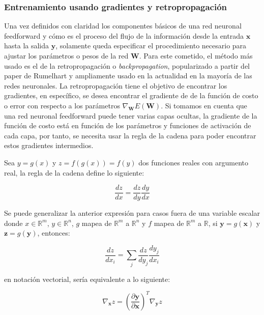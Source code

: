         \subsubsection{Entrenamiento usando gradientes y retropropagación} \label{sec:gradientes}

        Una vez definidos con claridad los componentes básicos de una red neuronal feedforward y cómo es el proceso del flujo 
        de la información desde la entrada $\mathbf{x}$ hasta la salida $\mathbf{y}$, solamente queda especificar el procedimiento 
        necesario para ajustar los parámetros o pesos de la red $\mathbf{W}$. Para este cometido, el método más usado es el 
        de la retropropagación o \textit{backpropagation}, popularizado a partir del paper de Rumelhart \cite{rumelhart1986learning} 
        y ampliamente usado en la actualidad en la mayoría de las redes neuronales. La retropropagación tiene el objetivo de 
        encontrar los gradientes, en específico, se desea encontrar el gradiente de de la función de costo o error con respecto 
        a los parámetros $\nabla_{\mathbf{W}}E(\mathbf{W})$. Si tomamos en cuenta que una red neuronal feedforward puede tener 
        varias capas ocultas, la gradiente de la función de costo está en función de los parámetros y funciones de activación 
        de cada capa, por tanto, se necesita usar la regla de la cadena para poder encontrar estos gradientes intermedios.

        Sea $y = g(x)$ y $z = f(g(x)) = f(y)$ dos funciones reales con argumento real, la regla de la cadena define lo siguiente:

        \begin{equation}
            \frac{dz}{dx} = \frac{dz}{dy} \frac{dy}{dx}
        \end{equation}

        Se puede generalizar la anterior expresión para casos fuera de una variable escalar donde $x \in \mathbb{R}^m$, 
        $y \in \mathbb{R}^n$, $g$ mapea de $\mathbb{R}^m$ a $\mathbb{R}^n$ y $f$ mapea de $\mathbb{R}^m$ a $\mathbb{R}$,
        si $\mathbf{y} = g(\mathbf{x})$ y $\mathbf{z} = g(\mathbf{y})$, entonces:

        \begin{equation}
            \frac{dz}{dx_i} =\sum_j \frac{dz}{dy_j} \frac{dy_j}{dx_i}
        \end{equation}

        en notación vectorial, sería equivalente a lo siguiente:

        \begin{equation}
            \nabla_{\mathbf{x}}z = \left( \frac{\partial \mathbf{y}}{\partial \mathbf{x}} \right)^T \nabla_{\mathbf{y}} z
        \end{equation}

